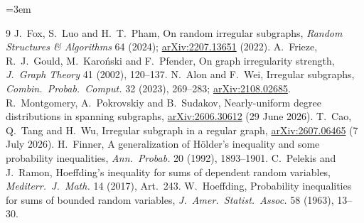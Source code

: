 \documentclass[11pt,a4paper]{article}
\theoremstyle{plain}
\theoremstyle{definition}
\theoremstyle{remark}
\begin{document}
\begingroup\sloppy\emergencystretch=3em

\endgroup

\begin{thebibliography}{9}
\small
\setlength{\itemsep}{2pt}
 J.~Fox, S.~Luo and H.~T.~Pham, On random irregular subgraphs, \emph{Random Structures \& Algorithms} 64 (2024); \href{https://arxiv.org/abs/2207.13651}{arXiv:2207.13651} (2022).
 A.~Frieze, R.~J.~Gould, M.~Karo\'nski and F.~Pfender, On graph irregularity strength, \emph{J.\ Graph Theory} 41 (2002), 120--137.
 N.~Alon and F.~Wei, Irregular subgraphs, \emph{Combin.\ Probab.\ Comput.} 32 (2023), 269--283; \href{https://arxiv.org/abs/2108.02685}{arXiv:2108.02685}.
 R.~Montgomery, A.~Pokrovskiy and B.~Sudakov, Nearly-uniform degree distributions in spanning subgraphs, \href{https://arxiv.org/abs/2606.30612}{arXiv:2606.30612} (29 June 2026).
 T.~Cao, Q.~Tang and H.~Wu, Irregular subgraph in a regular graph, \href{https://arxiv.org/abs/2607.06465}{arXiv:2607.06465} (7 July 2026).
 H.~Finner, A generalization of H\"older's inequality and some probability inequalities, \emph{Ann.\ Probab.} 20 (1992), 1893--1901.
 C.~Pelekis and J.~Ramon, Hoeffding's inequality for sums of dependent random variables, \emph{Mediterr.\ J.\ Math.} 14 (2017), Art.~243.
 W.~Hoeffding, Probability inequalities for sums of bounded random variables, \emph{J.\ Amer.\ Statist.\ Assoc.} 58 (1963), 13--30.
\end{thebibliography}
\end{document}
